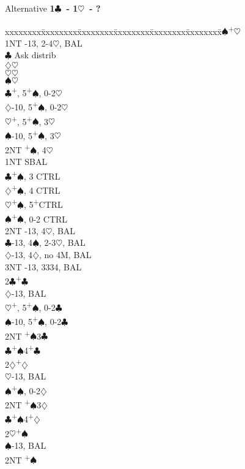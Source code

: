 \documentclass[10pt]{article}
\renewcommand{\c}{$\clubsuit$}
\renewcommand{\d}{$\diamondsuit$}
\newcommand{\h}{$\heartsuit$}
\newcommand{\s}{$\spadesuit$}
\newcommand{\p}{\textsuperscript{+}}
\newenvironment{bidtable}[1][]
{\textbf{#1}
  \begin{adjustwidth}{1em}{}
    \addvspace{2pt}
    \begin{tabbing}
      xxxxxxxx\=xxxxxxxx\=xxxxxxxx\=xxxxxxxx\=xxxxxxxx\=xxxxxxxx\=\kill}
{\end{tabbing}\end{adjustwidth}\bigskip}%
\begin{document}
\begin{multicols*}{2}
Alternative
\begin{bidtable}[1\c\ - 1\h\ - ?]
1\s {}\p\h                                      \\
    \> 1NT -13, 2-4\h, BAL                   \\
    \>     \c \> Ask distrib                  \\
    \>     \>     \d {}\h                   \\
    \>     \>     \h {}\h                   \\
    \>     \>     \s {}\h                   \\
    \c {}\p, 5\p\s, 0-2\h                  \\
    \d {}-10, 5\p\s, 0-2\h                  \\
    \h {}\p, 5\p\s, 3\h                    \\
    \s {}-10, 5\p\s, 3\h                    \\
    \> 2NT \p\s, 4\h                          \\
1NT \> SBAL                                       \\
    \c {}\p\s, 3 CTRL                       \\
    \d {}\p\s, 4 CTRL                       \\
    \h {}\p\s, 5\p CTRL                     \\
    \s {}\p\s, 0-2 CTRL                     \\
    \> 2NT -13, 4\h, BAL                     \\
    \c {}-13, 4\s, 2-3\h, BAL              \\
    \d {}-13, 4\d, no 4M, BAL              \\
    \> 3NT -13, 3334, BAL                    \\
2\c {}\p\c                                      \\
    \d {}-13, BAL                          \\
    \h {}\p, 5\p\s, 0-2\c                  \\
    \s {}-10, 5\p\s, 0-2\c                  \\
    \> 2NT \p\s 3\c                           \\
    \c {}\p\s 4\p\c                         \\
2\d {}\p\d                                      \\
    \h {}-13, BAL                          \\
    \s {}\p\s, 0-2\d                        \\
    \> 2NT \p\s 3\d                           \\
    \c {}\p\s 4\p\d                         \\
2\h {}\p\s                                      \\
    \s {}-13, BAL                          \\
    \> 2NT \p\s                               \\
\end{bidtable}


\end{multicols*}
\end{document}
